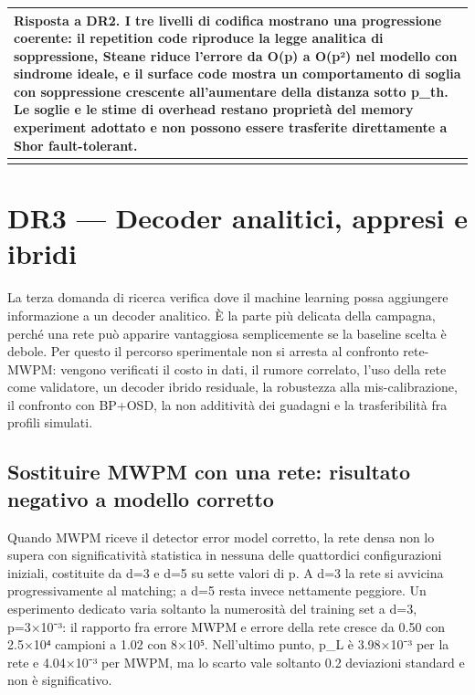 {\def\LTcaptype{none} %
\begin{longtable}[]{@{}
  >{\raggedright\arraybackslash}p{}@{}}
\toprule\noalign{}
\begin{minipage}[b]{\linewidth}\raggedright
\textbf{Risposta a DR2.} I tre livelli di codifica mostrano una progressione coerente: il repetition code riproduce la legge analitica di soppressione, Steane riduce l'errore da O(p) a O(p²) nel modello con sindrome ideale, e il surface code mostra un comportamento di soglia con soppressione crescente all'aumentare della distanza sotto p\_th. Le soglie e le stime di overhead restano proprietà del memory experiment adottato e non possono essere trasferite direttamente a Shor fault-tolerant.
\end{minipage} \\
\midrule\noalign{}
\endhead
\bottomrule\noalign{}
\endlastfoot
\end{longtable}
}

\section{DR3 --- Decoder analitici, appresi e ibridi}\label{sec:finale_5_3}\label{sec:decodifica_appresa}

La terza domanda di ricerca verifica dove il machine learning possa aggiungere informazione a un decoder analitico. È la parte più delicata della campagna, perché una rete può apparire vantaggiosa semplicemente se la baseline scelta è debole. Per questo il percorso sperimentale non si arresta al confronto rete-MWPM: vengono verificati il costo in dati, il rumore correlato, l'uso della rete come validatore, un decoder ibrido residuale, la robustezza alla mis-calibrazione, il confronto con BP+OSD, la non additività dei guadagni e la trasferibilità fra profili simulati.

\subsection{Sostituire MWPM con una rete: risultato negativo a modello corretto}\label{sec:finale_5_3_1}

Quando MWPM riceve il detector error model corretto, la rete densa non lo supera con significatività statistica in nessuna delle quattordici configurazioni iniziali, costituite da d=3 e d=5 su sette valori di p. A d=3 la rete si avvicina progressivamente al matching; a d=5 resta invece nettamente peggiore. Un esperimento dedicato varia soltanto la numerosità del training set a d=3, p=3×10⁻³: il rapporto fra errore MWPM e errore della rete cresce da 0.50 con 2.5×10⁴ campioni a 1.02 con 8×10⁵. Nell'ultimo punto, p\_L è 3.98×10⁻³ per la rete e 4.04×10⁻³ per MWPM, ma lo scarto vale soltanto 0.2 deviazioni standard e non è significativo.

